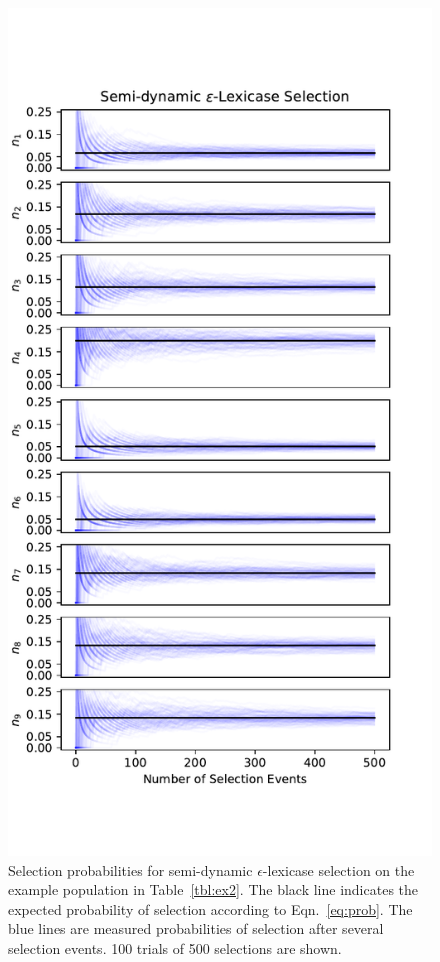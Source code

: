 \documentclass[twoside]{article}
\begin{document}
\begin{figure}
\begin{minipage}{0.49\textwidth}
\centering
  \includegraphics[width=\textwidth]{figs/eplex_semi_probability_convergence_500selections.pdf}
  \caption{Selection probabilities for semi-dynamic $\epsilon$-lexicase selection on the example population in Table~\ref{tbl:ex2}. The black line indicates the expected probability of selection according to Eqn.~\ref{eq:prob}. The blue lines are measured probabilities of selection after several selection events. 100 trials of 500 selections are shown.} \label{fig:prob_converge_eplex}
\end{minipage}
\hspace{0.02\textwidth}
\begin{minipage}{0.49\textwidth}


\end{minipage}
\end{figure}
\end{document}
